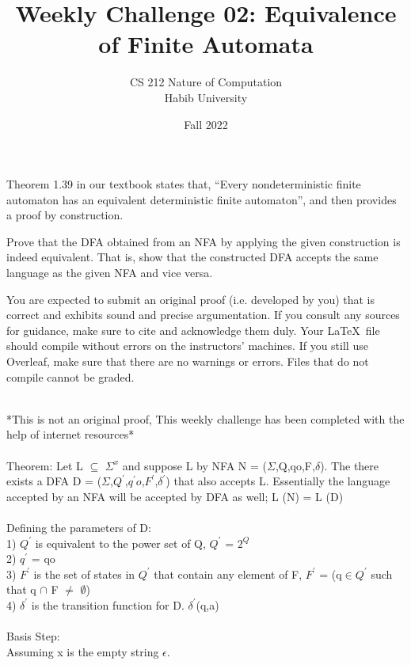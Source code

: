 \documentclass[a4paper]{exam}
\title{Weekly Challenge 02: Equivalence of Finite Automata}
\author{CS 212 Nature of Computation\\Habib University}
\date{Fall 2022}
\begin{document}
\maketitle

\begin{questions}
  

  Theorem 1.39 in our textbook states that, ``Every nondeterministic finite automaton has an equivalent deterministic finite automaton'', and then provides a proof by construction.

  Prove that the DFA obtained from an NFA by applying the given construction is indeed equivalent. That is, show that the constructed DFA accepts the same language as the given NFA and vice versa.
  
  You are expected to submit an original proof (i.e. developed by you) that is correct and exhibits sound and precise argumentation. If you consult any sources for guidance, make sure to cite and acknowledge them duly. Your \LaTeX\ file should compile without errors on the instructors' machines. If you still use Overleaf, make sure that there are no warnings or errors. Files that do not compile cannot be graded.
  
  \begin{solution} \\
    *This is not an original proof, This weekly challenge has been completed with the help of internet resources* \\ \\
    Theorem: Let L $ \subseteq $ $ \Sigma^{x} $ and suppose L by NFA N = ($\Sigma$,Q,qo,F,$\delta$).
    The there exists a DFA D = ($\Sigma$,$Q^{'}$,$q^{'}o$,$F^{'}$,$\delta^{'}$) that also accepts L.
    Essentially the language accepted by an NFA will be accepted by DFA as well; L (N) = L (D) \\
    \\
    Defining the parameters of D: \\
    1) $Q^{'}$ is equivalent to the power set of Q, $Q^{'}$ = $2^{Q}$ \\
    2) $q^{'}$ = {qo} \\
    3) $F^{'}$ is the set of states in $Q^{'}$ that contain any element of F, $F^{'}$ = (q$\in$$Q^{'}$ such that q $\cap$ F $\neq$ $\emptyset$) \\
    4) $\delta^{'}$ is the transition function for D. $\delta^{'}$(q,a) \\
    \\
    Basis Step: \\
    Assuming x is the empty string $\epsilon$. \\


\end{solution}
\end{questions}
\end{document}
